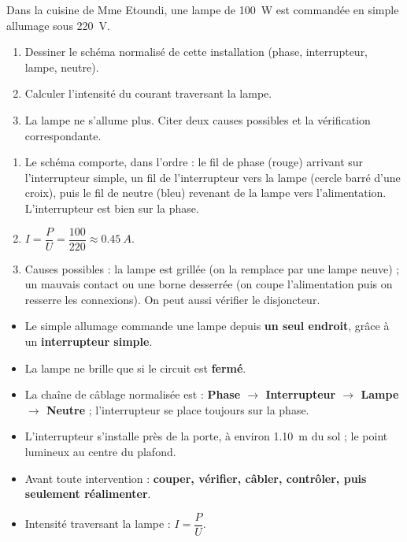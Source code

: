 \documentclass[11pt]{article}
\begin{document}
\begin{exercice}
Dans la cuisine de Mme Etoundi, une lampe de \SI{100}{W} est commandée en simple allumage sous \SI{220}{V}.
\begin{enumerate}
\item Dessiner le schéma normalisé de cette installation (phase, interrupteur, lampe, neutre).
\item Calculer l'intensité du courant traversant la lampe.
\item La lampe ne s'allume plus. Citer deux causes possibles et la vérification correspondante.
\end{enumerate}
\end{exercice}

\begin{corrige}
\begin{enumerate}
\item Le schéma comporte, dans l'ordre : le fil de phase (rouge) arrivant sur l'interrupteur simple, un fil de l'interrupteur vers la lampe (cercle barré d'une croix), puis le fil de neutre (bleu) revenant de la lampe vers l'alimentation. L'interrupteur est bien sur la phase.
\item $I = \dfrac{P}{U} = \dfrac{100}{220} \approx \SI{0,45}{A}$.
\item Causes possibles : la lampe est grillée (on la remplace par une lampe neuve) ; un mauvais contact ou une borne desserrée (on coupe l'alimentation puis on resserre les connexions). On peut aussi vérifier le disjoncteur.
\end{enumerate}
\end{corrige}

\begin{aretenir}
\begin{itemize}
\item Le simple allumage commande une lampe depuis \textbf{un seul endroit}, grâce à un \textbf{interrupteur simple}.
\item La lampe ne brille que si le circuit est \textbf{fermé}.
\item La chaîne de câblage normalisée est : \textbf{Phase $\rightarrow$ Interrupteur $\rightarrow$ Lampe $\rightarrow$ Neutre} ; l'interrupteur se place toujours sur la phase.
\item L'interrupteur s'installe près de la porte, à environ \SI{1,10}{m} du sol ; le point lumineux au centre du plafond.
\item Avant toute intervention : \textbf{couper, vérifier, câbler, contrôler, puis seulement réalimenter}.
\item Intensité traversant la lampe : $I = \dfrac{P}{U}$.
\end{itemize}
\end{aretenir}
\end{document}
